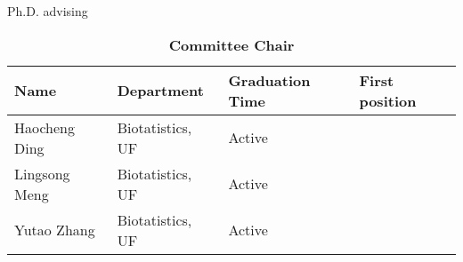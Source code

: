 \documentclass{resume} %
\begin{document}
\begin{rSection}{Ph.D. advising}

\begin{table}[htp]
\caption*{\textbf{Committee Chair}}
\begin{center}
\begin{tabular}{l l l l}
\hline
\hline
Name & Department & Graduation Time & First position \\
\hline
Haocheng Ding & Biotatistics, UF & Active &  \\
Lingsong Meng & Biotatistics, UF & Active &  \\
Yutao Zhang & Biotatistics, UF & Active &  \\
\hline
\hline
\end{tabular}
\end{center}
\label{default}
\end{table}%



\end{rSection}
\end{document}
